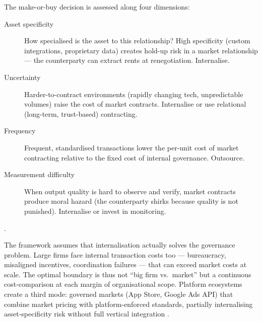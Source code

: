 The make-or-buy decision is assessed along four dimensions:
\begin{description}
  \item[Asset specificity] How specialised is the asset to this relationship? High specificity
    (custom integrations, proprietary data) creates hold-up risk in a market relationship ---
    the counterparty can extract rents at renegotiation. Internalise.
  \item[Uncertainty] Harder-to-contract environments (rapidly changing tech, unpredictable volumes)
    raise the cost of market contracts. Internalise or use relational (long-term, trust-based) contracting.
  \item[Frequency] Frequent, standardised transactions lower the per-unit cost of market contracting
    relative to the fixed cost of internal governance. Outsource.
  \item[Measurement difficulty] When output quality is hard to observe and verify, market contracts
    produce moral hazard (the counterparty shirks because quality is not punished). Internalise
    or invest in monitoring.
\end{description}
\parencite{coase1937nature}.

The framework assumes that internalisation actually solves the governance problem. Large firms face
internal transaction costs too --- bureaucracy, misaligned incentives, coordination failures ---
that can exceed market costs at scale. The optimal boundary is thus not ``big firm vs.\ market''
but a continuous cost-comparison at each margin of organisational scope. Platform ecosystems create
a third mode: governed markets (App Store, Google Ads API) that combine market pricing with
platform-enforced standards, partially internalising asset-specificity risk without full vertical
integration \parencite{dranove7theconomics}.

